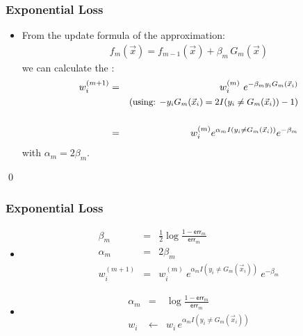 \begin{frame}
  \frametitle{Exponential Loss \cont}

  \begin{itemize}
    \item From the update formula of the approximation:
      \begin{eqnarray*}
        f_m(\vec x) = f_{m-1}(\vec x) + \beta_m \, G_m(\vec x)
      \end{eqnarray*}
      we can calculate the :
      \begin{eqnarray*}
        w_i^{(m+1)} 
          &=& w_i^{(m)} ~ e^{-\beta_m y_i G_m(\vec{x}_i)} \\ \vspace{1cm} %
          & & \mbox{\small(using: $-y_i G_m(\vec{x}_i) = 2 I (y_i \neq G_m(\vec{x}_i)) - 1$)} \\[.5cm] %
          &=& w_i^{(m)} e^{\alpha_m I(y_i \neq G_m(\vec{x}_i))} e^{-\beta_m}
      \end{eqnarray*}
      with $\alpha_m = 2 \beta_m$.
  \end{itemize}

  \hfill \qed
\end{frame}


\begin{frame}
  \frametitle{Exponential Loss \cont}


  \begin{itemize}
    \item {}
      \begin{eqnarray*}
        \beta_m     &=& \frac{1}{2} \log \frac{1 - \mathsf{err}_m}{\mathsf{err}_m} \\
        \alpha_m    &=& 2 \beta_m \\
        w_i^{(m+1)} &=& w_i^{(m)} ~ e^{\alpha_m I(y_i \neq G_m(\vec{x}_i))} ~ e^{-\beta_m}
      \end{eqnarray*}
      \pspread
    \item {}
      \begin{eqnarray*}
        \alpha_m &=&          \log \frac{1- \mathsf{err}_m}{\mathsf{err}_m} \\
        w_i      &\leftarrow& w_i \, e^{\alpha_m I(y_i \neq G_m(\vec{x}_i))}
      \end{eqnarray*}
  \end{itemize}
\end{frame}


